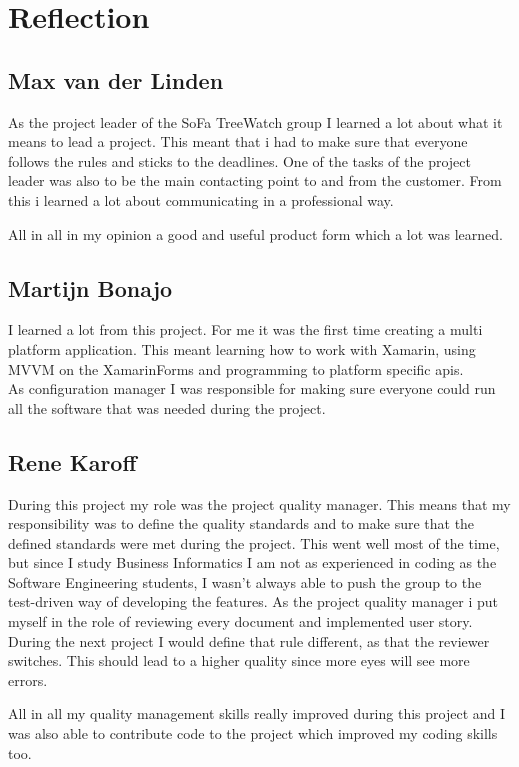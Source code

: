 \section{Reflection}
\subsection{Max van der Linden}
As the project leader of the SoFa TreeWatch group I learned a lot about what it means to lead a project. This meant that i had to make sure that everyone follows the rules and sticks to the deadlines. One of the tasks of the project leader was also to be the main contacting point to and from the customer. From this i learned a lot about communicating in a professional way.

All in all in my opinion a good and useful product form which a lot was learned.

\subsection{Martijn Bonajo}

I learned a lot from this project. For me it was the first time creating a multi platform application. This meant learning how to work with Xamarin, using MVVM on the \gls{XamarinForms} and programming to platform specific \gls{api}s.\\
As configuration manager I was responsible for making sure everyone could run all the software that was needed during the project.

\subsection{Rene Karoff}
During this project my role was the project quality manager. This means that my responsibility was to define the quality standards and to make sure that the defined standards were met during the project. This went well most of the time, but since I study Business Informatics I am not as experienced in coding as the Software Engineering students, I wasn't always able to push the group to the test-driven way of developing the features. As the project quality manager i put myself in the role of reviewing every document and implemented user story. During the next project I would define that rule different, as that the reviewer switches. This should lead to a higher quality since more eyes will see more errors.

All in all my quality management skills really improved during this project and I was also able to contribute code to the project which improved my coding skills too.

